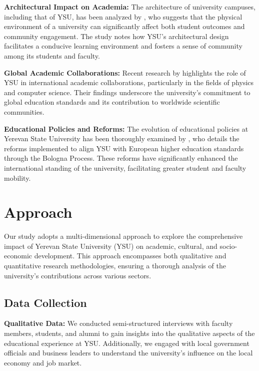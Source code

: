 \documentclass[12pt,onecolumn]{article}
\begin{document}
\textbf{Architectural Impact on Academia:} The architecture of university campuses, including that of YSU, has been analyzed by \cite{carter2021architectural}, who suggests that the physical environment of a university can significantly affect both student outcomes and community engagement. The study notes how YSU’s architectural design facilitates a conducive learning environment and fosters a sense of community among its students and faculty.

\textbf{Global Academic Collaborations:} Recent research by \cite{zhang2022global} highlights the role of YSU in international academic collaborations, particularly in the fields of physics and computer science. Their findings underscore the university's commitment to global education standards and its contribution to worldwide scientific communities.

\textbf{Educational Policies and Reforms:} The evolution of educational policies at Yerevan State University has been thoroughly examined by \cite{ghazaryan2023educational}, who details the reforms implemented to align YSU with European higher education standards through the Bologna Process. These reforms have significantly enhanced the international standing of the university, facilitating greater student and faculty mobility.


\clearpage
\section{Approach}

Our study adopts a multi-dimensional approach to explore the comprehensive impact of Yerevan State University (YSU) on academic, cultural, and socio-economic development. This approach encompasses both qualitative and quantitative research methodologies, ensuring a thorough analysis of the university's contributions across various sectors.

\subsection{Data Collection}

\textbf{Qualitative Data:} We conducted semi-structured interviews with faculty members, students, and alumni to gain insights into the qualitative aspects of the educational experience at YSU. Additionally, we engaged with local government officials and business leaders to understand the university's influence on the local economy and job market.
\end{document}
